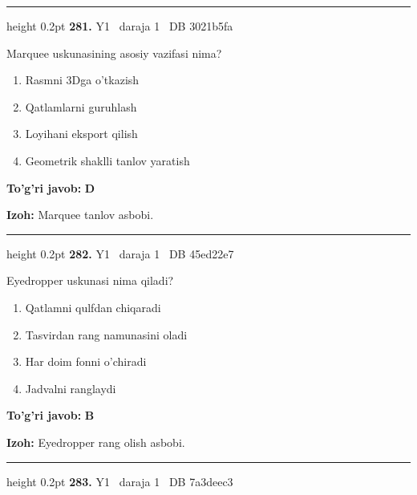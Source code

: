 \documentclass[10pt,a4paper,oneside]{article}
\begin{document}
\vspace{2mm}\hrule height 0.2pt \vspace{4mm}
\hypertarget{q281}{\textbf{\color{ink}281.}}  {\color{muted}\scriptsize Y1 \textbullet\ daraja 1 \textbullet\ DB 3021b5fa}
\par
Marquee uskunasining asosiy vazifasi nima?
\begin{enumerate}[label=\Alph*),leftmargin=9mm]
\item Rasmni 3Dga o'tkazish
\item Qatlamlarni guruhlash
\item Loyihani eksport qilish
\item Geometrik shaklli tanlov yaratish
\end{enumerate}
\begin{tcolorbox}[enhanced,breakable,colback=teal!4,colframe=teal!45!black,boxrule=0.45pt,arc=1.2mm,left=2.8mm,right=2.8mm,top=2mm,bottom=2mm,before skip=2mm,after skip=2mm]
\textbf{\color{teal}To'g'ri javob:} \textbf{D}
\par\smallskip
\textbf{Izoh:} Marquee tanlov asbobi.
\end{tcolorbox}
\vspace{2mm}\hrule height 0.2pt \vspace{4mm}
\hypertarget{q282}{\textbf{\color{ink}282.}}  {\color{muted}\scriptsize Y1 \textbullet\ daraja 1 \textbullet\ DB 45ed22e7}
\par
Eyedropper uskunasi nima qiladi?
\begin{enumerate}[label=\Alph*),leftmargin=9mm]
\item Qatlamni qulfdan chiqaradi
\item Tasvirdan rang namunasini oladi
\item Har doim fonni o'chiradi
\item Jadvalni ranglaydi
\end{enumerate}
\begin{tcolorbox}[enhanced,breakable,colback=teal!4,colframe=teal!45!black,boxrule=0.45pt,arc=1.2mm,left=2.8mm,right=2.8mm,top=2mm,bottom=2mm,before skip=2mm,after skip=2mm]
\textbf{\color{teal}To'g'ri javob:} \textbf{B}
\par\smallskip
\textbf{Izoh:} Eyedropper rang olish asbobi.
\end{tcolorbox}
\vspace{2mm}\hrule height 0.2pt \vspace{4mm}
\hypertarget{q283}{\textbf{\color{ink}283.}}  {\color{muted}\scriptsize Y1 \textbullet\ daraja 1 \textbullet\ DB 7a3deec3}
\end{document}
